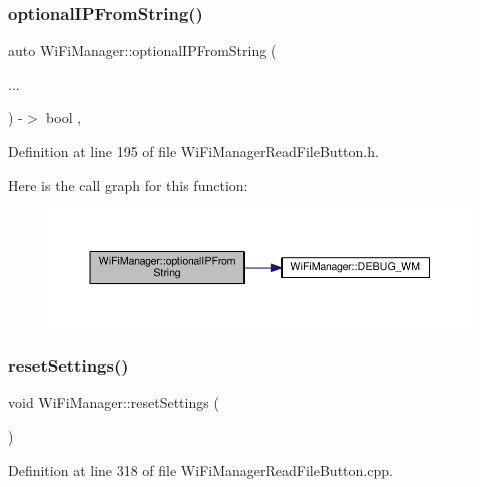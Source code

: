 \subsubsection{\texorpdfstring{optional\+I\+P\+From\+String()}{optionalIPFromString()}\hspace{0.1cm}{\footnotesize\ttfamily [2/2]}}
{\footnotesize\ttfamily auto Wi\+Fi\+Manager\+::optional\+I\+P\+From\+String (\begin{DoxyParamCaption}\item[{}]{... }\end{DoxyParamCaption}) -\/$>$ bool \hspace{0.3cm}{\ttfamily [inline]}, {\ttfamily [private]}}



Definition at line 195 of file Wi\+Fi\+Manager\+Read\+File\+Button.\+h.

Here is the call graph for this function\+:\nopagebreak
\begin{figure}[H]
\begin{center}
\leavevmode
\includegraphics[width=350pt]{class_wi_fi_manager_aa248b818eee0423b14a88c637f7c4637_cgraph}
\end{center}
\end{figure}
\mbox{\label{class_wi_fi_manager_a0027749816b6c66bc845d7c5db760a33}} 
\subsubsection{\texorpdfstring{reset\+Settings()}{resetSettings()}}
{\footnotesize\ttfamily void Wi\+Fi\+Manager\+::reset\+Settings (\begin{DoxyParamCaption}{ }\end{DoxyParamCaption})}



Definition at line 318 of file Wi\+Fi\+Manager\+Read\+File\+Button.\+cpp.

